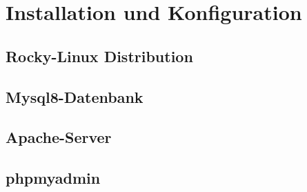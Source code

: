 \chapter{Installation und Konfiguration}
\section{Rocky-Linux Distribution}
\section{Mysql8-Datenbank}
\section{Apache-Server}
\section{phpmyadmin}